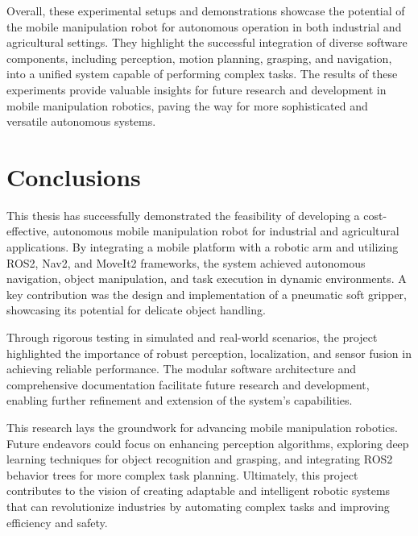 Overall, these experimental setups and demonstrations showcase the potential of the mobile manipulation robot
for autonomous operation in both industrial and agricultural settings. They highlight the successful integration 
of diverse software components, including perception, motion planning, grasping, and navigation, into a 
unified system capable of performing complex tasks.  The results of these experiments provide valuable insights
for future research and development in mobile manipulation robotics, paving the way for more sophisticated 
and versatile autonomous systems.

\section{Conclusions}

This thesis has successfully demonstrated the feasibility of developing a cost-effective, autonomous mobile 
manipulation robot for industrial and agricultural applications. By integrating a mobile platform with a robotic
arm and utilizing ROS2, Nav2, and MoveIt2 frameworks, the system achieved autonomous navigation, object manipulation, 
and task execution in dynamic environments. A key contribution was the design and implementation of a pneumatic 
soft gripper, showcasing its potential for delicate object handling.

Through rigorous testing in simulated and real-world scenarios, the project highlighted the importance of robust 
perception, localization, and sensor fusion in achieving reliable performance. The modular software architecture 
and comprehensive documentation facilitate future research and development, enabling further refinement and 
extension of the system's capabilities.

This research lays the groundwork for advancing mobile manipulation robotics. Future endeavors could focus on 
enhancing perception algorithms, exploring deep learning techniques for object recognition and grasping, and 
integrating ROS2 behavior trees for more complex task planning. Ultimately, this project contributes to the 
vision of creating adaptable and intelligent robotic systems that can revolutionize industries by automating 
complex tasks and improving efficiency and safety.
